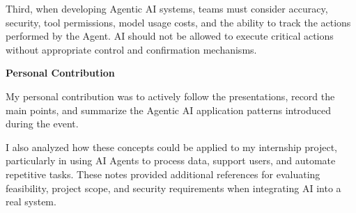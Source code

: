 Third, when developing Agentic AI systems, teams must consider accuracy,
security, tool permissions, model usage costs, and the ability to track
the actions performed by the Agent. AI should not be allowed to execute
critical actions without appropriate control and confirmation
mechanisms.

\vspace{0.5em}\noindent\textbf{Personal Contribution}\par

My personal contribution was to actively follow the presentations,
record the main points, and summarize the Agentic AI application
patterns introduced during the event.

I also analyzed how these concepts could be applied to my internship
project, particularly in using AI Agents to process data, support users,
and automate repetitive tasks. These notes provided additional
references for evaluating feasibility, project scope, and security
requirements when integrating AI into a real system.
